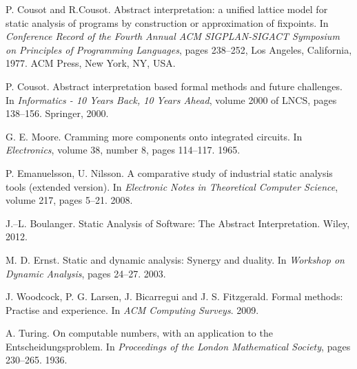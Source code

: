 \documentclass[12pt,final,oneside]{fithesis2}
\theoremstyle{definition}
\begin{document}

\renewcommand*{\bibname}{\chapter{Bibliography}\vspace{-1em}}
\begin{thebibliography}{99}

P{.} Cousot and R{.}Cousot.
\newblock Abstract interpretation: a unified lattice model for static
  analysis of programs by construction or approximation of fixpoints.
\newblock In \emph{Conference Record of the Fourth Annual ACM
  SIGPLAN-SIGACT Symposium on Principles of Programming Languages},
  pages 238--252, Los Angeles, California, 1977. ACM Press, New York,
  NY, USA.

P{.} Cousot.
\newblock Abstract interpretation based formal methods and future
  challenges.
\newblock In \emph{Informatics - 10 Years Back, 10 Years Ahead},
  volume 2000 of LNCS, pages 138--156. Springer, 2000.

G{.} E{.} Moore.
\newblock Cramming more components onto integrated circuits.
\newblock In \emph{Electronics}, volume 38, number 8, pages 114--117. 1965.

P{.} Emanuelsson, U{.} Nilsson.
\newblock A comparative study of industrial static analysis tools (extended
  version).
\newblock In \emph{Electronic Notes in Theoretical Computer Science},
  volume 217, pages 5--21. 2008.

J{.}--L{.} Boulanger.
\newblock Static Analysis of Software: The Abstract Interpretation.
\newblock Wiley, 2012.

M{.} D{.} Ernst.
\newblock Static and dynamic analysis: Synergy and duality.
\newblock In \emph{Workshop on Dynamic Analysis}, pages 24--27. 2003.

J{.} Woodcock, P{.} G{.} Larsen, J{.} Bicarregui and J{.} S{.} Fitzgerald.
\newblock Formal methods: Practise and experience.
\newblock In \emph{ACM Computing Surveys}. 2009.

A{.} Turing.
\newblock On computable numbers, with an application to the
  Entscheidungsproblem.
\newblock In \emph{Proceedings of the London Mathematical Society},
  pages 230--265. 1936.


\end{thebibliography}
\end{document}
